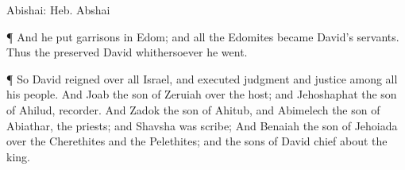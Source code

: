 {{Abishai: Heb. Abshai}
\par }{\PP {}¶ And he
put
garrisons in
Edom; and all the
Edomites became
David’s
servants. Thus the
{}
preserved
David whithersoever he
went.
\par }{\PP {}¶ So
David
reigned over all
Israel, and
executed
judgment and
justice among all his
people.
And
Joab the
son of
Zeruiah
{} over the
host; and
Jehoshaphat the
son of
Ahilud,
recorder.
And
Zadok the
son of
Ahitub, and
Abimelech the
son of
Abiathar,
{} the
priests; and
Shavsha was
scribe;
And
Benaiah the
son of
Jehoiada
{} over the
Cherethites and the
Pelethites; and the
sons of
David
{}
chief
about the
king.

}
